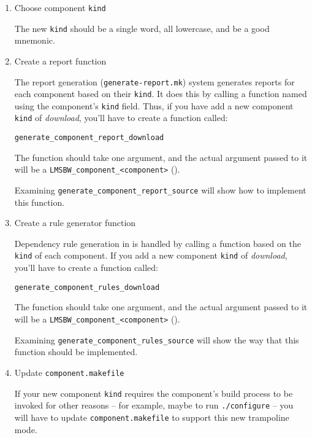 \begin{enumerate}
\item Choose component \texttt{kind}

  The new \texttt{kind} should be a single word, all lowercase, and be
  a good mnemonic.

\item Create a report function

  The report generation (\texttt{generate-report.mk}) system generates
  reports for each component based on their \texttt{kind}.  It does
  this by calling a function named using the component's \texttt{kind}
  field.  Thus, if you have add a new component \texttt{kind} of
  \emph{download}, you'll have to create a function called:

\begin{verbatim}
generate_component_report_download
\end{verbatim}

  The function should take one argument, and the actual argument
  passed to it will be a \texttt{LMSBW\_component\_<component>}
  ().

  Examining \texttt{generate\_component\_report\_source} will show how
  to implement this function.

\item Create a rule generator function

  Dependency rule generation in \lmsbw is handled by calling a
  function based on the \texttt{kind} of each component.  If you add a
  new component \texttt{kind} of \emph{download}, you'll have to
  create a function called:

\begin{verbatim}
generate_component_rules_download
\end{verbatim}

  The function should take one argument, and the actual argument
  passed to it will be a \texttt{LMSBW\_component\_<component>}
  ().

  Examining \texttt{generate\_component\_rules\_source} will show the
  way that this function should be implemented.

\item Update \texttt{component.makefile}

  If your new component \texttt{kind} requires the component's build
  process to be invoked for other reasons -- for example, maybe to run
  \texttt{./configure} -- you will have to update
  \texttt{component.makefile} to support this new trampoline mode.


\end{enumerate}
